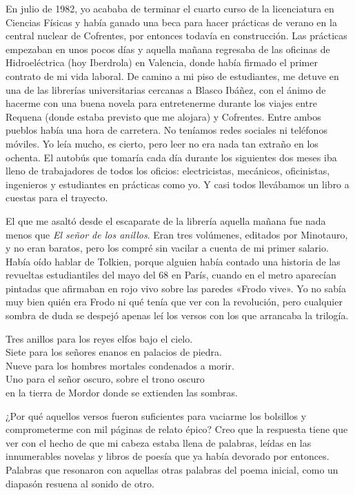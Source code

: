 \label{cap:intro}

En julio de 1982, yo acababa de terminar el cuarto curso de la licenciatura en Ciencias Físicas y había ganado una beca para hacer prácticas de verano en la central nuclear de Cofrentes, por entonces todavía en construcción. Las prácticas empezaban en unos pocos días y aquella mañana regresaba de las oficinas de Hidroeléctrica (hoy Iberdrola) en Valencia, donde había firmado el primer contrato de mi vida laboral. De camino a mi piso de estudiantes, me detuve en una de las librerías universitarias cercanas a Blasco Ibáñez, con el ánimo de hacerme con una buena novela para entretenerme durante los viajes entre Requena (donde estaba previsto que me alojara) y Cofrentes. Entre ambos pueblos había una hora de carretera. No teníamos redes sociales ni teléfonos móviles. Yo leía mucho, es cierto, pero leer no era nada tan extraño en los ochenta. El autobús que tomaría cada día durante los siguientes dos meses iba lleno de trabajadores de todos los oficios: electricistas, mecánicos, oficinistas, ingenieros y estudiantes en prácticas como yo. Y casi todos llevábamos un libro a cuestas para el trayecto.

El que me asaltó desde el escaparate de la librería aquella mañana fue nada menos que \emph{El señor de los anillos}. Eran tres volúmenes, editados por Minotauro, y no eran baratos, pero los compré sin vacilar a cuenta de mi primer salario. Había oído hablar de Tolkien, porque alguien había contado una historia de las revueltas estudiantiles del mayo del 68 en París, cuando en el metro aparecían pintadas que afirmaban en rojo vivo sobre las paredes «Frodo vive». Yo no sabía muy bien quién era Frodo ni qué tenía que ver con la revolución, pero cualquier sombra de duda se despejó apenas leí los versos con los que arrancaba la trilogía.

\begin{versocita}
Tres anillos para los reyes elfos bajo el cielo.\\
Siete para los señores enanos en palacios de piedra.\\
Nueve para los hombres mortales condenados a morir.\\
Uno para el señor oscuro, sobre el trono oscuro\\
en la tierra de Mordor donde se extienden las sombras.
\end{versocita}

¿Por qué aquellos versos fueron suficientes para vaciarme los bolsillos y comprometerme con mil páginas de relato épico? Creo que la respuesta tiene que ver con el hecho de que mi cabeza estaba llena de palabras, leídas en las innumerables novelas y libros de poesía que ya había devorado por entonces. Palabras que resonaron con aquellas otras palabras del poema inicial, como un diapasón resuena al sonido de otro.


